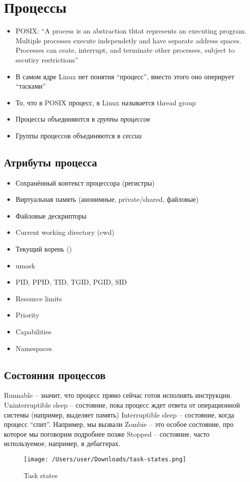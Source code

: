 \section{Процессы}
    \begin{itemize}
      \item POSIX: ``A process is an abstraction thtat represents an executing program. Multiple processes execute independetly and have separate address spaces. Processes can ceate, interrupt, and terminate other processes, subject to secutiry restrictions''
      \item В самом ядре Linux нет понятия ``процесс'', вместо этого оно оперирует ``тасками''
      \item То, что в POSIX процесс, в Linux называется thread group
      \item Процессы объединяются в \textit{группы процессов}
      \item Группы процессов объединяются в \textit{сессии}
    \end{itemize}
  
  \subsection{Атрибуты процесса}
    \begin{itemize}
      \item Сохранённый контекст процессора (регистры)
      \item Виртуальная память (анонимные, private/shared, файловые)
      \item Файловые дескрипторы
      \item Current working directory (cwd)
      \item Текущий корень ()
      \item umask
      \item PID, PPID, TID, TGID, PGID, SID
      \item Resource limits
      \item Priority
      \item Capabilities
      \item Namespaces
    \end{itemize}
  
  \subsection{Состояния процессов}
    Runnable -- значит, что процесс прямо сейчас готов исполнять инструкции.
    Uninterruptible sleep -- состояние, пока процесс ждет ответа от операционной системы (например, выделяет память)
    Interruptible sleep -- состояние, когда процесс ``спит''. Например, мы вызвали 
    Zombie -- это особое состояние, про которое мы поговорим подробнее позже
    Stopped -- состояние, часто используемое, например, в дебаггерах.
\begin{figure}[H]
\centering
  \texttt{[image: /Users/user/Downloads/task-states.png]}
  \caption{Task states}
  \label{fig:task_states}
\end{figure}  
  
